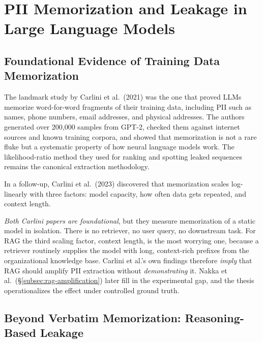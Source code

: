 \documentclass[12pt,a4paper]{report}
\begin{document}

\newpage
\section{PII Memorization and Leakage in Large Language Models}
\label{sec:pii-leakage}

\subsection{Foundational Evidence of Training Data Memorization}

The landmark study by Carlini et al.\ (2021) was the one that proved LLMs memorize word-for-word fragments of their training data, including PII such as names, phone numbers, email addresses, and physical addresses. The authors generated over 200{,}000 samples from GPT-2, checked them against internet sources and known training corpora, and showed that memorization is not a rare fluke but a systematic property of how neural language models work. The likelihood-ratio method they used for ranking and spotting leaked sequences remains the canonical extraction methodology.

In a follow-up, Carlini et al.\ (2023) discovered that memorization scales log-linearly with three factors: model capacity, how often data gets repeated, and context length.

\begin{critbox}
\textit{Both Carlini papers are foundational}, but they measure memorization of a static model in isolation. There is no retriever, no user query, no downstream task. For RAG the third scaling factor, context length, is the most worrying one, because a retriever routinely supplies the model with long, context-rich prefixes from the organizational knowledge base. Carlini et al.'s own findings therefore \emph{imply} that RAG should amplify PII extraction without \emph{demonstrating} it. Nakka et al.\ (\S\ref{subsec:rag-amplification}) later fill in the experimental gap, and the thesis operationalizes the effect under controlled ground truth.
\end{critbox}

\subsection{Beyond Verbatim Memorization: Reasoning-Based Leakage}
\end{document}
